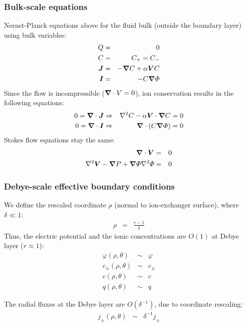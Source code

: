 \subsubsection  {Bulk-scale equations}
Nernst-Planck equations above for the fluid bulk (outside
the boundary layer) using bulk variables:
\begin{eqnarray}
 \nonumber Q & = & 0 \\
 \nonumber C & = & C_+ = C_- \\
\boldsymbol{J} &=& -\boldsymbol{\nabla} C + \alpha \boldsymbol{V} C \\
\boldsymbol{I} &=& -C \boldsymbol{\nabla} \varPhi
\end{eqnarray}
Since the flow is incompressible ($\boldsymbol{\nabla} \cdot V = 0$), 
ion conservation results in the following equations:
\begin{eqnarray}
0 = \boldsymbol{\nabla} \cdot \boldsymbol{J} &\Rightarrow& \nabla^2 C - \alpha \boldsymbol{V} \cdot \boldsymbol{\nabla} C = 0 \\
0 = \boldsymbol{\nabla} \cdot \boldsymbol{I} &\Rightarrow& \boldsymbol{\nabla} \cdot \left( C \boldsymbol{\nabla} \varPhi \right) = 0
\end{eqnarray}
Stokes flow equations stay the same:
\begin{eqnarray}
\boldsymbol{\nabla} \cdot \boldsymbol{V} &=& 0 \\
\nabla^2 \boldsymbol{V} - \boldsymbol{\nabla} P + \boldsymbol{\nabla} \varPhi \nabla^2 \varPhi &=& 0
\end{eqnarray}

\subsubsection{Debye-scale effective boundary conditions}
We define the rescaled coordinate $\rho$ (normal to ion-exchanger surface), where $\delta \ll 1$:
\begin{eqnarray}
 \nonumber \rho &=& \frac{r-1}{\delta} 
\end{eqnarray}
Thus, the electric potential and the ionic concentrations are $O(1)$ at Debye layer ($r \approx 1$):
\begin{eqnarray}
 \nonumber \varphi(\rho,\theta) &\sim& \varphi \\
 \nonumber c_\pm(\rho,\theta) &\sim& c_\pm \\
 \nonumber c(\rho,\theta) &\sim& c \\
 \nonumber q(\rho,\theta) &\sim& q
\end{eqnarray}

The radial fluxes at the Debye layer are $O(\delta^{-1})$, due to coordinate rescaling:
\begin{eqnarray}
 \nonumber j_\pm(\rho, \theta) &\sim& \delta^{-1} j_\pm
\end{eqnarray}

